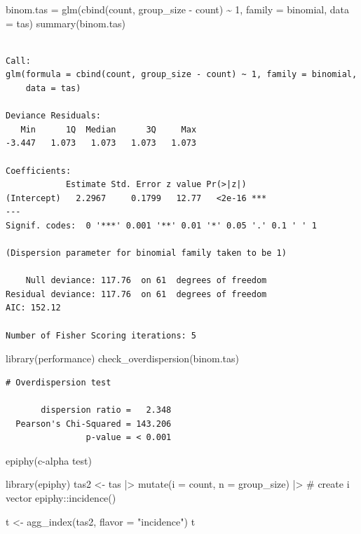 \documentclass[
  letterpaper,
]{book}
\newenvironment{Shaded}{\begin{snugshade}}{\end{snugshade}}
\newcommand{\AttributeTok}[1]{\textcolor[rgb]{0.40,0.45,0.13}{#1}}
\newcommand{\CommentTok}[1]{\textcolor[rgb]{0.37,0.37,0.37}{#1}}
\newcommand{\DecValTok}[1]{\textcolor[rgb]{0.68,0.00,0.00}{#1}}
\newcommand{\FunctionTok}[1]{\textcolor[rgb]{0.28,0.35,0.67}{#1}}
\newcommand{\NormalTok}[1]{\textcolor[rgb]{0.00,0.23,0.31}{#1}}
\newcommand{\OtherTok}[1]{\textcolor[rgb]{0.00,0.23,0.31}{#1}}
\newcommand{\SpecialCharTok}[1]{\textcolor[rgb]{0.37,0.37,0.37}{#1}}
\newcommand{\StringTok}[1]{\textcolor[rgb]{0.13,0.47,0.30}{#1}}
\begin{document}
\begin{Shaded}
\begin{Highlighting}[]
\NormalTok{binom.tas }\OtherTok{=} \FunctionTok{glm}\NormalTok{(}\FunctionTok{cbind}\NormalTok{(count, group\_size }\SpecialCharTok{{-}}\NormalTok{ count) }\SpecialCharTok{\textasciitilde{}} \DecValTok{1}\NormalTok{,}
                \AttributeTok{family =}\NormalTok{ binomial,}
                \AttributeTok{data =}\NormalTok{ tas)}
\FunctionTok{summary}\NormalTok{(binom.tas)}
\end{Highlighting}
\end{Shaded}

\begin{verbatim}

Call:
glm(formula = cbind(count, group_size - count) ~ 1, family = binomial, 
    data = tas)

Deviance Residuals: 
   Min      1Q  Median      3Q     Max  
-3.447   1.073   1.073   1.073   1.073  

Coefficients:
            Estimate Std. Error z value Pr(>|z|)    
(Intercept)   2.2967     0.1799   12.77   <2e-16 ***
---
Signif. codes:  0 '***' 0.001 '**' 0.01 '*' 0.05 '.' 0.1 ' ' 1

(Dispersion parameter for binomial family taken to be 1)

    Null deviance: 117.76  on 61  degrees of freedom
Residual deviance: 117.76  on 61  degrees of freedom
AIC: 152.12

Number of Fisher Scoring iterations: 5
\end{verbatim}

\begin{Shaded}
\begin{Highlighting}[]
\FunctionTok{library}\NormalTok{(performance)}
\FunctionTok{check\_overdispersion}\NormalTok{(binom.tas)}
\end{Highlighting}
\end{Shaded}

\begin{verbatim}
# Overdispersion test

       dispersion ratio =   2.348
  Pearson's Chi-Squared = 143.206
                p-value = < 0.001
\end{verbatim}

epiphy(c-alpha test)

\begin{Shaded}
\begin{Highlighting}[]
\FunctionTok{library}\NormalTok{(epiphy)}
\NormalTok{tas2 }\OtherTok{\textless{}{-}}\NormalTok{ tas }\SpecialCharTok{|\textgreater{}}
  \FunctionTok{mutate}\NormalTok{(}\AttributeTok{i =}\NormalTok{ count,}
         \AttributeTok{n =}\NormalTok{ group\_size) }\SpecialCharTok{|\textgreater{}}  \CommentTok{\# create i vector}
\NormalTok{  epiphy}\SpecialCharTok{::}\FunctionTok{incidence}\NormalTok{()}

\NormalTok{t }\OtherTok{\textless{}{-}} \FunctionTok{agg\_index}\NormalTok{(tas2, }\AttributeTok{flavor =} \StringTok{"incidence"}\NormalTok{)}
\NormalTok{t}
\end{Highlighting}
\end{Shaded}
\end{document}
